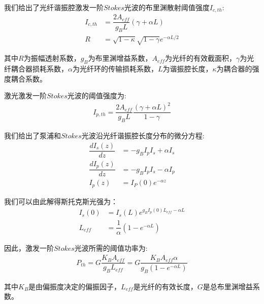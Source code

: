 \documentclass[UTF8]{ctexart}
\begin{document}
我们给出了光纤谐振腔激发一阶$Stokes$光波的布里渊散射阈值强度$I_{c,th}$:
\begin{equation}
	\begin{aligned}
		I_{c,th}&=\dfrac{2A_{eff}}{g_{B}L}(\gamma +\alpha L)\\
		R&=\sqrt{1-\kappa}\sqrt{1-\gamma}e^{-\alpha L/2}
	\end{aligned}
\end{equation}


其中$R$为振幅透射系数，$g_{B}$为布里渊增益系数，$A_{eff}$为光纤的有效截面积，$\gamma$为光纤耦合器损耗系数，$\alpha$为光纤环的传输损耗系数，$L$为谐振腔长度，$\kappa$为耦合器的强度耦合系数。


激光激发一阶$Stokes$光波的阈值强度为:
\begin{equation}
	\begin{aligned}
		I_{p,th}=\dfrac{2A_{eff}}{g_{B}L}\dfrac{(\gamma+\alpha L)^{2}}{1-\gamma}
	\end{aligned}
\end{equation}


我们给出了泵浦和$Stokes$光波沿光纤谐振腔长度分布的微分方程:
\begin{equation}
	\begin{aligned}
		\dfrac{dI_{s}(z)}{dz}&=-g_{B}I_{p}I_{s}+\alpha I_{s}\\
		\dfrac{dI_{p}(z)}{dz}&=-g_{B}I_{p}I_{s}-\alpha I_{p}\\
		I_{p}(z)&=I_{P}(0)e^{-\alpha z}
	\end{aligned}
\end{equation}


我们可以由此解得斯托克斯光强为：\begin{equation}
	\begin{aligned}
		I_{s}(0)&=I_{s}(L)e^{g_{B}I_{p}(0)L_{eff}-\alpha L}\\
		L_{eff}&=\dfrac{1}{\alpha}(1-e^{-\alpha L})
	\end{aligned}
\end{equation}


因此，激发一阶$Stokes$光波所需的阈值功率为:
\begin{equation}
	\begin{aligned}
		P_{th}=G\dfrac{K_{B}A_{eff}}{g_{B}L_{eff}}=G\dfrac{K_{B}A_{eff}\alpha}{g_{B}(1-e^{-\alpha L})}
	\end{aligned}
\end{equation}


其中$K_{B}$是由偏振度决定的偏振因子，$L_{eff}$是光纤的有效长度，$G$是总布里渊增益系数。
\end{document}
